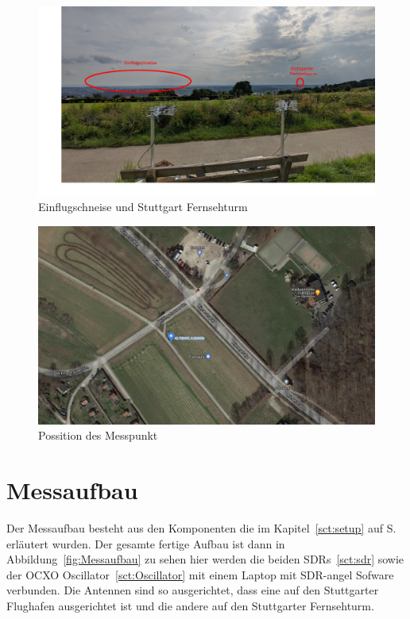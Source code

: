 \begin{figure}
    \centering
    \includegraphics[width=\textwidth]{images/Einflugschneise.jpg}
    \caption{Einflugschneise und Stuttgart Fernsehturm}\label{fig:Einflugschneise}
\end{figure}

\begin{figure}
    \centering
    \includegraphics[width=\textwidth]{images/Maps_Messpunkt.png}
    \caption{Possition des Messpunkt}\label{fig:Maps}
\end{figure}

\section{Messaufbau}
Der Messaufbau besteht aus den Komponenten die im Kapitel~\ref{sct:setup} auf S.\pageref{sct:setup} erläutert wurden. Der gesamte fertige Aufbau ist dann in Abbildung~\ref{fig:Messaufbau} zu sehen hier werden die beiden SDRs~\ref{sct:sdr} sowie der OCXO Oscillator~\ref{sct:Oscillator} mit einem Laptop mit SDR-angel Sofware verbunden. Die Antennen sind so ausgerichtet, dass eine auf den Stuttgarter Flughafen ausgerichtet ist und die andere auf den Stuttgarter Fernsehturm. 

